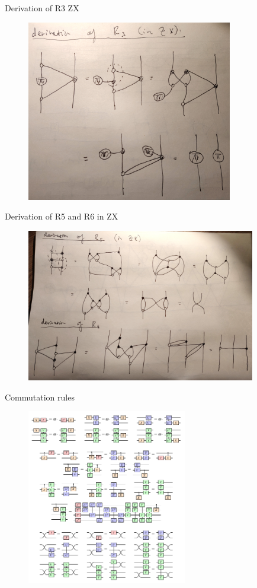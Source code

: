\documentclass{beamer}
\theoremstyle{definition}
\begin{document}
\begin{frame}{Derivation of R3 ZX}

\begin{figure}
\includegraphics[width=9cm]{R3}
\centering
\end{figure}
\end{frame}

\begin{frame}{Derivation of R5 and R6 in ZX}

\begin{figure}
\includegraphics[width=10cm]{R5-R6}
\centering
\end{figure}
\end{frame}

\begin{frame}{Commutation rules}

\begin{figure}
\includegraphics[width=7cm]{commutation-rules}
\centering
\end{figure}
\end{frame}
\end{document}
